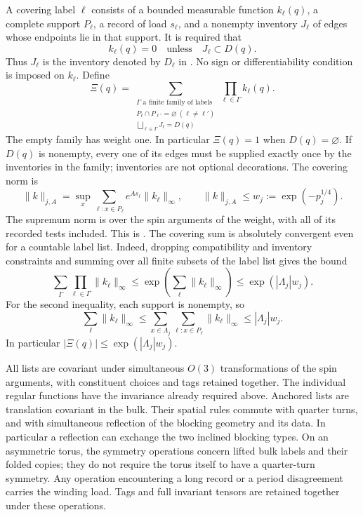 A covering label $\ell$ consists of a bounded measurable function
$k_\ell(q)$, a complete support $P_\ell$, a record of load $s_\ell$, and
a nonempty inventory $J_\ell$ of edges whose endpoints lie in that
support.  It is required that
\[
 k_\ell(q)=0\quad\text{unless}\quad J_\ell\subset D(q).
\]
Thus $J_\ell$ is the inventory denoted by $D_\ell$ in
.
No sign or differentiability condition is imposed on $k_\ell$.
Define
\begin{equation}
 \Xi(q)=
  \sum_{\substack{\Gamma\text{ a finite family of labels}\\
                   P_\ell\cap P_{\ell'}=\varnothing\ (\ell\ne\ell')\\
                   \bigsqcup_{\ell\in\Gamma}J_\ell=D(q)}}
                       \prod_{\ell\in\Gamma}k_\ell(q).
 \label{eq:setup-covering-sum}
\end{equation}
The empty family has weight one.  In particular $\Xi(q)=1$ when
$D(q)=\varnothing$.  If $D(q)$ is nonempty, every one of its edges must
be supplied exactly once by the inventories in the family; inventories
are not optional decorations.  The covering norm is
\begin{equation}
 \|k\|_{j,A}
   =\sup_x\sum_{\ell:x\in P_\ell}
                e^{As_\ell}\|k_\ell\|_\infty,
 \qquad
 \|k\|_{j,A}\le w_j:=\exp(-p_j^{1/4}).
 \label{eq:setup-covering-norm}
\end{equation}
The supremum norm is over the spin arguments of the weight, with all
of its recorded tests included.  This is .
The covering sum is absolutely convergent even for a countable label
list.  Indeed, dropping compatibility and inventory constraints and
summing over all finite subsets of the label list gives the bound
\begin{equation}
 \sum_{\Gamma}\prod_{\ell\in\Gamma}\|k_\ell\|_\infty
 \le\exp\!\left(\sum_\ell\|k_\ell\|_\infty\right)
 \le\exp(|\Lambda_j|w_j).
 \label{eq:setup-covering-convergence}
\end{equation}
For the second inequality, each support is nonempty, so
\[
 \sum_\ell\|k_\ell\|_\infty
 \le\sum_{x\in\Lambda_j}\sum_{\ell:x\in P_\ell}\|k_\ell\|_\infty
 \le|\Lambda_j|w_j.
\]
In particular $|\Xi(q)|\le\exp(|\Lambda_j|w_j)$.

All lists are covariant under simultaneous $O(3)$ transformations of
the spin arguments, with constituent choices and tags retained together.
The individual regular functions have the invariance already required
above.  Anchored lists are translation covariant in the bulk.  Their
spatial rules commute with quarter turns, and with simultaneous
reflection of the blocking geometry and its data.  In particular a
reflection can exchange the two inclined blocking types.  On an
asymmetric torus, the symmetry operations concern lifted bulk labels
and their folded copies; they do not require the torus itself to have a
quarter-turn symmetry.  Any operation encountering a long record or a
period disagreement carries the winding load.  Tags and full invariant
tensors are retained together under these operations.

